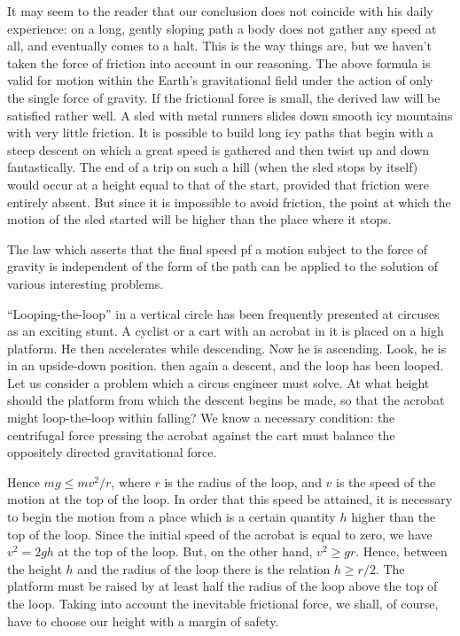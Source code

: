 It may seem to the reader that our conclusion does not
coincide with his daily experience: on a long, gently
sloping path a body does not gather any speed at all,
and eventually comes to a halt. This is the way things are,
but we haven't taken the force of friction into account
in our reasoning. The above formula is valid for motion
within the Earth's gravitational field under the action of
only the single force of gravity. If the frictional force
is small, the derived law will be satisfied rather well.
A sled with metal runners slides down smooth icy mountains with very little friction. It is possible to build
long icy paths that begin with a steep descent on which
a great speed is gathered and then twist up and down
fantastically. The end of a trip on such a hill (when the
sled stops by itself) would occur at a height equal to
that of the start, provided that friction were entirely
absent. But since it is impossible to avoid friction, the
point at which the motion of the sled started will be
higher than the place where it stops.

The law which asserts that the final speed pf a motion subject to the force of gravity is independent of the form of the path can be applied to the solution of various interesting problems.

``Looping-the-loop'' in a vertical circle has been frequently presented at circuses as an exciting stunt. A cyclist or a cart with an acrobat in it is placed on a high
platform. He then accelerates while descending. Now
he is ascending. Look, he is in an upside-down position.
then again a descent, and the loop has been looped. Let
us consider a problem which a circus engineer must solve.
At what height should the platform from which the descent begins be made, so that the acrobat might loop-the-loop within falling? We know a necessary condition:
the centrifugal force pressing the acrobat against the cart
must balance the oppositely directed gravitational force.

Hence $mg \leqslant mv^{2}/r$, where $r$ is the radius of the loop,
and $v$ is the speed of the motion at the top of the loop.
In order that this speed be attained, it is necessary to
begin the motion from a place which is a certain quantity
$h$ higher than the top of the loop. Since the initial speed
of the acrobat is equal to zero, we have $v^{2} = 2gh$ at the
top of the loop. But, on the other hand, $v^{2} \geqslant gr$. Hence,
between the height $h$ and the radius of the loop there is
the relation $h \geqslant r/2$. The platform must be raised by
at least half the radius of the loop above the top of the
loop. Taking into account the inevitable frictional force,
we shall, of course, have to choose our height with a margin of safety.

